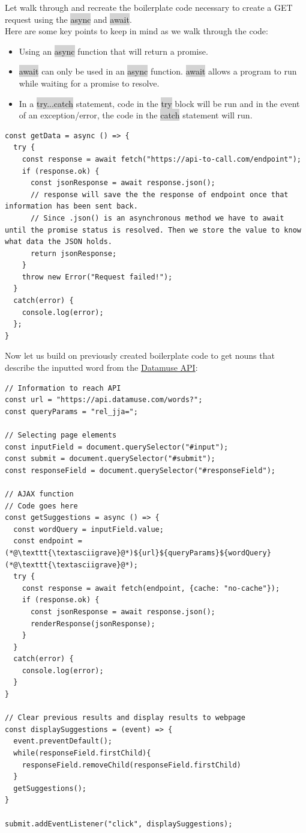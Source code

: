 \documentclass[11pt]{article}
\begin{document}
Let walk through and recreate the boilerplate code necessary to create a GET request using the \colorbox{lightgray}{async} and \colorbox{lightgray}{await}. \\
\newline
Here are some key points to keep in mind as we walk through the code:
\begin{itemize}[leftmargin = *]
\item Using an \colorbox{lightgray}{async} function that will return a promise.
\item \colorbox{lightgray}{await} can only be used in an \colorbox{lightgray}{async} function. \colorbox{lightgray}{await} allows a program to run while waiting for a promise to resolve.
\item In a \colorbox{lightgray}{try...catch} statement, code in the \colorbox{lightgray}{try} block will be run and in the event of an exception/error, the code in the \colorbox{lightgray}{catch} statement will run.
\end{itemize}
\begin{lstlisting}
const getData = async () => {
  try {
    const response = await fetch("https://api-to-call.com/endpoint");
    if (response.ok) {
      const jsonResponse = await response.json(); 
      // response will save the the response of endpoint once that information has been sent back.
      // Since .json() is an asynchronous method we have to await until the promise status is resolved. Then we store the value to know what data the JSON holds.
      return jsonResponse; 
    }
    throw new Error("Request failed!");
  }
  catch(error) {
    console.log(error);
  }; 
}
\end{lstlisting}
Now let us build on previously created boilerplate code to get nouns that describe the inputted word from the \href{https://www.datamuse.com/api/}{Datamuse API}:
\begin{lstlisting}
// Information to reach API
const url = "https://api.datamuse.com/words?";
const queryParams = "rel_jja=";

// Selecting page elements
const inputField = document.querySelector("#input");
const submit = document.querySelector("#submit");
const responseField = document.querySelector("#responseField");

// AJAX function
// Code goes here
const getSuggestions = async () => {
  const wordQuery = inputField.value; 
  const endpoint = (*@\texttt{\textasciigrave}@*)${url}${queryParams}${wordQuery}(*@\texttt{\textasciigrave}@*); 
  try {
    const response = await fetch(endpoint, {cache: "no-cache"});
    if (response.ok) {
      const jsonResponse = await response.json(); 
      renderResponse(jsonResponse); 
    }
  }
  catch(error) {
    console.log(error); 
  }
}

// Clear previous results and display results to webpage
const displaySuggestions = (event) => {
  event.preventDefault();
  while(responseField.firstChild){
    responseField.removeChild(responseField.firstChild)
  }
  getSuggestions();
}

submit.addEventListener("click", displaySuggestions);
\end{lstlisting}
\end{document}
